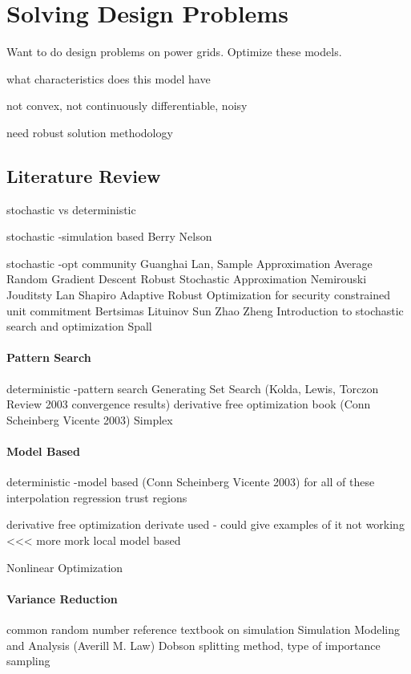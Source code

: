 \newcommand{\mypathdfo}{../thesis/dfo}
\newcommand{\mypathdfodata}{../thesis/dfo/data}
\chapter{Solving Design Problems}

Want to do design problems on power grids.  Optimize these models. 

what characteristics does this model have

not convex, not continuously differentiable, noisy 

need robust solution methodology 


\section{Literature Review}



stochastic vs deterministic



stochastic 
-simulation based
Berry Nelson

stochastic
-opt community
Guanghai Lan, 
Sample Approximation Average
Random Gradient Descent
Robust Stochastic Approximation Nemirouski Jouditsty Lan Shapiro
Adaptive Robust Optimization for security constrained unit commitment Bertsimas Lituinov Sun Zhao Zheng
Introduction to stochastic search and optimization Spall

\subsubsection{Pattern Search}
deterministic
-pattern search
Generating Set Search (Kolda, Lewis, Torczon Review 2003 convergence results)
derivative free optimization book (Conn Scheinberg Vicente 2003)
Simplex


\subsubsection{Model Based}
deterministic
-model based (Conn Scheinberg Vicente 2003) for all of these
interpolation
regression
trust regions


derivative free optimization
derivate used - could give examples of it not working <<< more mork
local model based


Nonlinear Optimization \endnote{}


\subsubsection{Variance Reduction}
common random number
reference textbook on simulation Simulation Modeling and Analysis (Averill M. Law) \cite{law_2007}
Dobson splitting method, type of importance sampling

